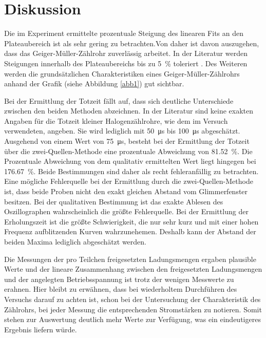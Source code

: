 \section{Diskussion}

Die im Experiment ermittelte prozentuale Steigung des linearen Fits an den Plateaubereich ist als sehr gering zu betrachten.Von daher
ist davon auszugehen, dass das Geiger-Müller-Zählrohr zuverlässig arbeitet. In der Literatur werden Steigungen innerhalb des Plateaubereichs bis
zu \SI{5}{\percent} toleriert \cite{Q2}.
Des Weiteren werden die grundsätzlichen Charakteristiken eines Geiger-Müller-Zählrohrs anhand der Grafik (siehe Abbildung \ref{abb1}) gut sichtbar.

\noindent Bei der Ermittlung der Totzeit fällt auf, dass sich deutliche Unterschiede zwischen den beiden Methoden abzeichnen.
In der Literatur \cite{Q2} sind keine exakten Angaben für die Totzeit kleiner Halogenzählrohre, wie dem im Versuch verwendeten, angeben.
Sie wird lediglich mit \SI{50}{\micro \second} bis \SI{100}{\micro \second} abgeschätzt.
Ausgehend von einem Wert von \SI{75}{\micro \second}, besteht bei der Ermittlung der Totzeit über die
zwei-Quellen-Methode eine prozentuale Abweichung von \SI{81,52}{\percent}. Die Prozentuale Abweichung von dem qualitativ ermittelten Wert
liegt hingegen bei \SI{176,67}{\percent}. Beide Bestimmungen sind daher als recht fehleranfällig zu betrachten.
Eine mögliche Fehlerquelle bei der Ermittlung durch die zwei-Quellen-Methode ist, dass beide Proben nicht den exakt gleichen Abstand vom
Glimmerfenster besitzen. Bei der qualitativen Bestimmung ist das exakte Ablesen des Oszillographen wahrscheinlich die größte Fehlerquelle.
Bei der Ermittlung der Erholungszeit ist die größte Schwierigkeit, die nur sehr kurz und mit einer hohen Frequenz aufblitzenden Kurven
wahrzunehemen. Deshalb kann der Abstand der beiden Maxima lediglich abgeschätzt werden.

\noindent Die Messungen der pro Teilchen freigesetzten Ladungsmengen ergaben plausible Werte und der lineare Zusammenhang zwischen den freigesetzten
Ladungsmengen und der angelegten Betriebsspannung ist trotz der wenigen Messwerte zu erahnen.
Hier bleibt zu erwähnen, dass bei wiederholtem Durchführen des Versuchs darauf zu achten ist, schon bei der Untersuchung der Charakteristik
des Zählrohrs, bei jeder Messung die entsprechenden Stromstärken zu notieren. Somit stehen zur Auswertung deutlich mehr Werte zur Verfügung,
was ein eindeutigeres Ergebnis liefern würde.



\newpage
\nocite{*}
\printbibliography
